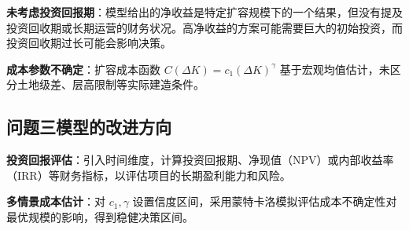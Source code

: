 \noindent\textbf{未考虑投资回报期}：模型给出的净收益是特定扩容规模下的一个结果，但没有提及投资回收期或长期运营的财务状况。高净收益的方案可能需要巨大的初始投资，而投资回收期过长可能会影响决策。

\noindent\textbf{成本参数不确定}：扩容成本函数 $C(\Delta K)=c_1(\Delta K)^{\gamma}$ 基于宏观均值估计，未区分土地级差、层高限制等实际建造条件。\\[2pt]

\subsection[\hspace{-2pt}问题三模型的改进方向]{{\heiti{} \hspace{-8pt}问题三模型的改进方向}}\label{subsection5: 问题三模型改进}


\noindent\textbf{投资回报评估}：引入时间维度，计算投资回报期、净现值（NPV）或内部收益率（IRR）等财务指标，以评估项目的长期盈利能力和风险。

\noindent\textbf{多情景成本估计}：对 $c_1,\gamma$ 设置信度区间，采用蒙特卡洛模拟评估成本不确定性对最优规模的影响，得到稳健决策区间。\\



